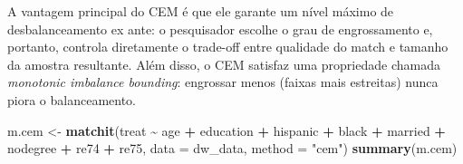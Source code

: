 \documentclass[
]{article}
\newenvironment{Shaded}{\begin{snugshade}}{\end{snugshade}}
\newcommand{\AttributeTok}[1]{\textcolor[rgb]{0.13,0.29,0.53}{#1}}
\newcommand{\FunctionTok}[1]{\textcolor[rgb]{0.13,0.29,0.53}{\textbf{#1}}}
\newcommand{\NormalTok}[1]{#1}
\newcommand{\OtherTok}[1]{\textcolor[rgb]{0.56,0.35,0.01}{#1}}
\newcommand{\SpecialCharTok}[1]{\textcolor[rgb]{0.81,0.36,0.00}{\textbf{#1}}}
\newcommand{\StringTok}[1]{\textcolor[rgb]{0.31,0.60,0.02}{#1}}
\begin{document}
A vantagem principal do CEM é que ele garante um nível máximo de desbalanceamento ex ante: o pesquisador escolhe o grau de engrossamento e, portanto, controla diretamente o trade-off entre qualidade do match e tamanho da amostra resultante. Além disso, o CEM satisfaz uma propriedade chamada \emph{monotonic imbalance bounding}: engrossar menos (faixas mais estreitas) nunca piora o balanceamento.

\begin{Shaded}
\begin{Highlighting}[]
\NormalTok{m.cem }\OtherTok{\textless{}{-}} \FunctionTok{matchit}\NormalTok{(treat }\SpecialCharTok{\textasciitilde{}}\NormalTok{ age }\SpecialCharTok{+}\NormalTok{ education }\SpecialCharTok{+}\NormalTok{ hispanic }\SpecialCharTok{+}\NormalTok{ black }\SpecialCharTok{+}\NormalTok{ married }\SpecialCharTok{+}\NormalTok{ nodegree }\SpecialCharTok{+}\NormalTok{ re74 }\SpecialCharTok{+}\NormalTok{ re75,}
                 \AttributeTok{data =}\NormalTok{ dw\_data, }\AttributeTok{method =} \StringTok{"cem"}\NormalTok{)}
\FunctionTok{summary}\NormalTok{(m.cem)}
\end{Highlighting}
\end{Shaded}
\end{document}
